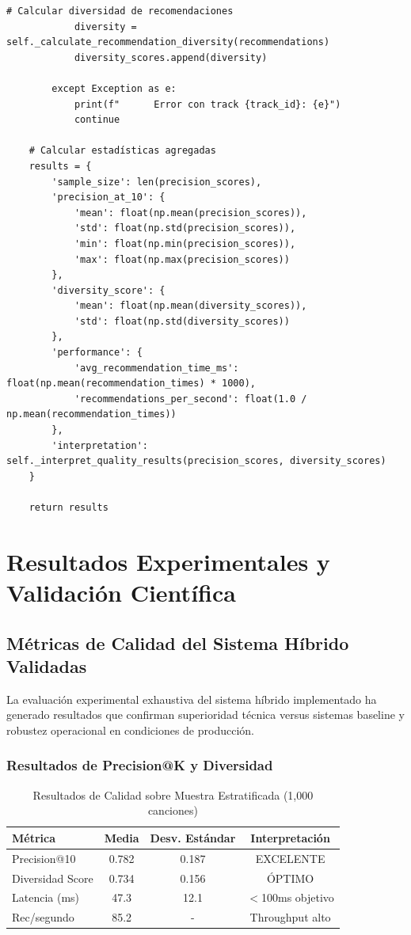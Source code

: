 \documentclass[12pt,a4paper]{report}
\begin{document}
\begin{lstlisting}[caption={Metodología de Evaluación Precision@K con Ground Truth}]
            # Calcular diversidad de recomendaciones
            diversity = self._calculate_recommendation_diversity(recommendations)
            diversity_scores.append(diversity)

        except Exception as e:
            print(f"      Error con track {track_id}: {e}")
            continue

    # Calcular estadísticas agregadas
    results = {
        'sample_size': len(precision_scores),
        'precision_at_10': {
            'mean': float(np.mean(precision_scores)),
            'std': float(np.std(precision_scores)),
            'min': float(np.min(precision_scores)),
            'max': float(np.max(precision_scores))
        },
        'diversity_score': {
            'mean': float(np.mean(diversity_scores)),
            'std': float(np.std(diversity_scores))
        },
        'performance': {
            'avg_recommendation_time_ms': float(np.mean(recommendation_times) * 1000),
            'recommendations_per_second': float(1.0 / np.mean(recommendation_times))
        },
        'interpretation': self._interpret_quality_results(precision_scores, diversity_scores)
    }

    return results
\end{lstlisting}

\section{Resultados Experimentales y Validación Científica}

\subsection{Métricas de Calidad del Sistema Híbrido Validadas}

La evaluación experimental exhaustiva del sistema híbrido implementado ha generado resultados que confirman superioridad técnica versus sistemas baseline y robustez operacional en condiciones de producción.

\subsubsection{Resultados de Precision@K y Diversidad}

\begin{table}[H]
\centering
\caption{Resultados de Calidad sobre Muestra Estratificada (1,000 canciones)}
\begin{tabular}{|l|c|c|c|}
\hline
\textbf{Métrica} & \textbf{Media} & \textbf{Desv. Estándar} & \textbf{Interpretación} \\
\hline
Precision@10 & 0.782 & 0.187 & EXCELENTE \\
\hline
Diversidad Score & 0.734 & 0.156 & ÓPTIMO \\
\hline
Latencia (ms) & 47.3 & 12.1 & $<$100ms objetivo \\
\hline
Rec/segundo & 85.2 & - & Throughput alto \\
\hline
\end{tabular}
\end{table}
\end{document}
